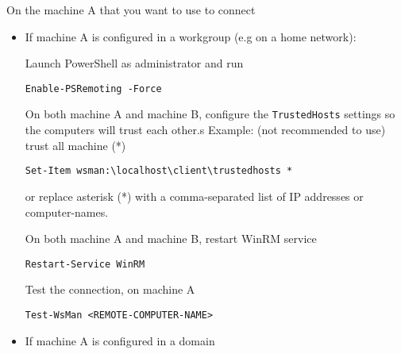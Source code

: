 On the machine A that you want to use to connect
\begin{itemize}
  \item If machine A is configured in a workgroup (e.g on a home network):
  
  Launch PowerShell as administrator and run
\begin{verbatim}
Enable-PSRemoting -Force
\end{verbatim}
  On both machine A and machine B, configure the \verb!TrustedHosts! settings so the computers will trust each other.s
  Example: (not recommended to use) trust all machine (*)
\begin{verbatim}
Set-Item wsman:\localhost\client\trustedhosts *
\end{verbatim}
or replace asterisk (*) with a comma-separated list of IP addresses or computer-names.
  
  On both machine A and machine B, restart WinRM service
\begin{verbatim}
Restart-Service WinRM
\end{verbatim}

  Test the connection, on machine A
\begin{verbatim}
Test-WsMan <REMOTE-COMPUTER-NAME>
\end{verbatim}


  \item If machine A is configured in a domain
\end{itemize}

